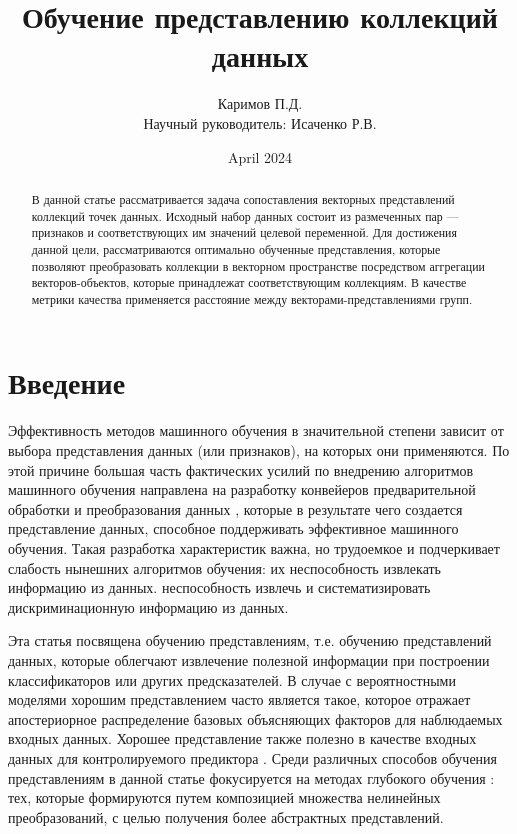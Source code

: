 \documentclass{article}
\title{Обучение представлению коллекций данных}
\author{Каримов П.Д.\\Научный руководитель: Исаченко Р.В.}
\date{April 2024}
\begin{document}
\maketitle

\begin{abstract}
    В данной статье рассматривается задача сопоставления векторных представлений коллекций точек данных. Исходный набор данных состоит из размеченных пар --- признаков и соответствующих им значений целевой переменной. Для достижения данной цели, рассматриваются оптимально обученные представления, которые позволяют преобразовать коллекции в векторном пространстве посредством аггрегации векторов-объектов, которые принадлежат соответствующим коллекциям. В качестве метрики качества применяется расстояние между векторами-представлениями групп. 
\end{abstract}

\section{Введение}

Эффективность методов машинного обучения в значительной степени
зависит от выбора представления данных (или признаков),
на которых они применяются. По этой причине большая часть фактических
усилий по внедрению алгоритмов машинного обучения направлена на
разработку конвейеров предварительной обработки и преобразования данных \cite{10.1145/3514221.3517848, Li2019PreprocessingMA}, которые
в результате чего создается представление данных, способное поддерживать эффективное
машинного обучения. Такая разработка характеристик важна, но
трудоемкое и подчеркивает слабость нынешних алгоритмов обучения: их неспособность извлекать информацию из данных.
неспособность извлечь и систематизировать дискриминационную информацию из данных.

Эта статья посвящена обучению представлениям, т.е. обучению
представлений данных, которые облегчают извлечение полезной
информации при построении классификаторов или других предсказателей. В случае с вероятностными моделями хорошим представлением часто является
такое, которое отражает апостериорное распределение базовых объясняющих факторов для наблюдаемых входных данных. Хорошее представление также полезно в качестве входных данных для контролируемого предиктора \cite{Devlin2019BERTPO}.
Среди различных способов обучения представлениям в данной статье
фокусируется на методах глубокого обучения \cite{baghaei2022deep}: тех, которые формируются путем
композицией множества нелинейных преобразований, с
целью получения более абстрактных представлений.
\end{document}
